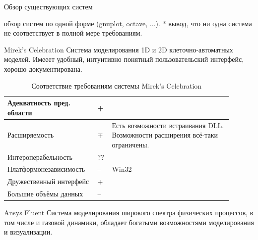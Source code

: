 \documentclass[a4paper,12pt]{extarticle}
\begin{document}
\begin{section}{Обзор существующих систем}

обзор систем по одной форме (gnuplot, octave, ...).
* вывод, что ни одна система не соответствует в полной мере требованиям.

\begin{subsection}{Mirek's Celebration}
    Система моделирования 1D и 2D клеточно-автоматных моделей.
    Имееет удобный, интуитивно понятный пользовательский интерфейс, хорошо документирована.

    \begin{table}[h]
        \caption{Соответствие требованиям системы Mirek's Celebration}
        \label{tabular:mirekscell}
        \begin{center}
            \begin{tabular}{|p{0.35\linewidth}|p{0.05\linewidth}|p{0.5\linewidth}|} \hline
                Адекватность пред. области & + & \\ \hline
                Расширяемость              & $\mp$ & Есть возможности встраивания DLL. Возможности расширения всё-таки ограничены. \\ \hline
                Интероперабельность        & ?? & \\ \hline
                Платформонезависимость     & -- & Win32 \\ \hline
                Дружественный интерфейс    & + & \\ \hline
                Большие объёмы данных      & -- & \\ \hline
            \end{tabular}
        \end{center}
    \end{table}
\end{subsection}

\begin{subsection}{Ansys Fluent}
    Система моделирования широкого спектра физических процессов, в том числе и газовой динамики, обладает богатыми возможностями моделирования и визуализации.


\end{subsection}
\end{section}
\end{document}
